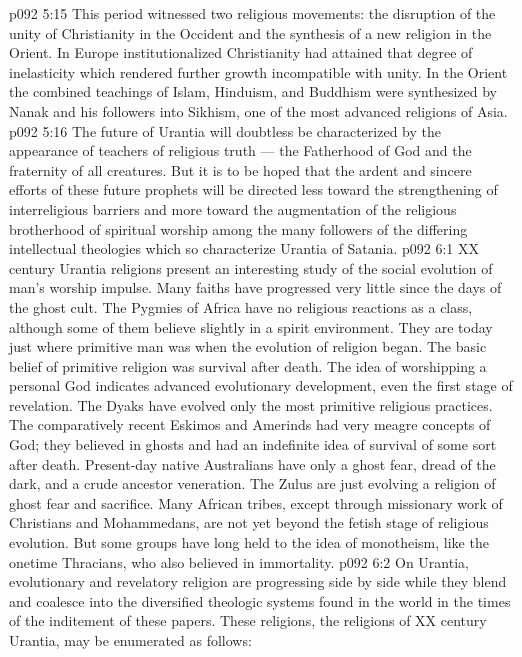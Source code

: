 \vs p092 5:15 \bibnobreakspace {} This period witnessed two religious movements: the disruption of the unity of Christianity in the Occident and the synthesis of a new religion in the Orient. In Europe institutionalized Christianity had attained that degree of inelasticity which rendered further growth incompatible with unity. In the Orient the combined teachings of Islam, Hinduism, and Buddhism were synthesized by Nanak and his followers into Sikhism, one of the most advanced religions of Asia.
\vs p092 5:16 \pc The future of Urantia will doubtless be characterized by the appearance of teachers of religious truth --- the Fatherhood of God and the fraternity of all creatures. But it is to be hoped that the ardent and sincere efforts of these future prophets will be directed less toward the strengthening of interreligious barriers and more toward the augmentation of the religious brotherhood of spiritual worship among the many followers of the differing intellectual theologies which so characterize Urantia of Satania.
\vs p092 6:1 XX century Urantia religions present an interesting study of the social evolution of man’s worship impulse. Many faiths have progressed very little since the days of the ghost cult. The Pygmies of Africa have no religious reactions as a class, although some of them believe slightly in a spirit environment. They are today just where primitive man was when the evolution of religion began. The basic belief of primitive religion was survival after death. The idea of worshipping a personal God indicates advanced evolutionary development, even the first stage of revelation. The Dyaks have evolved only the most primitive religious practices. The comparatively recent Eskimos and Amerinds had very meagre concepts of God; they believed in ghosts and had an indefinite idea of survival of some sort after death. Present\hyp{}day native Australians have only a ghost fear, dread of the dark, and a crude ancestor veneration. The Zulus are just evolving a religion of ghost fear and sacrifice. Many African tribes, except through missionary work of Christians and Mohammedans, are not yet beyond the fetish stage of religious evolution. But some groups have long held to the idea of monotheism, like the onetime Thracians, who also believed in immortality.
\vs p092 6:2 \pc On Urantia, evolutionary and revelatory religion are progressing side by side while they blend and coalesce into the diversified theologic systems found in the world in the times of the inditement of these papers. These religions, the religions of XX century Urantia, may be enumerated as follows:
